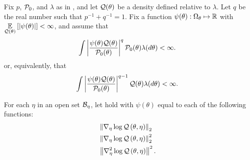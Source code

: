 \begin{assu}
%
Fix $p$, $\mathcal{P}_{0}$, and $\lambda$ as in , and let
$\mathcal{Q}(\theta)$ be a density defined relative to $\lambda$.  Let $q$ be the real
number such that $p^{-1} + q^{-1} = 1$.  Fix a function $\psi(\theta): \Omega_{\theta}
\mapsto \mathbb{R}$ with $\underset{\mathcal{Q}(\theta)}{\mathbb{E}}\left[\left|\psi(\theta)\right|\right] < \infty$, and
assume that
%
\begin{align*}
%
\int \abs{\frac{\psi(\theta) \q(\theta)}{\pbase(\theta)}}^q
\pbase(\theta) \lambda(d\theta) < \infty.
%
\end{align*}
%
or, equivalently, that
%
\begin{align*}
%
\int \abs{\frac{\psi(\theta) \q(\theta)}{\pbase(\theta)}}^{q-1}
    \q(\theta) \lambda(d\theta)
< \infty.
%
\end{align*}
%
\end{assu}


\begin{assu}
%
For each $\eta$ in an open set $\mathcal{B}_\eta$, let  hold with
$\psi(\theta)$ equal to each of the following functions:
%
\begin{align*}
%
& \norm{\lqgrad{\theta, \eta}}_2 \\
& \norm{\lqgrad{\theta, \eta}}^2_2 \\
& \norm{\lqhess{\theta, \eta}}^2.
%
\end{align*}
%
\end{assu}



